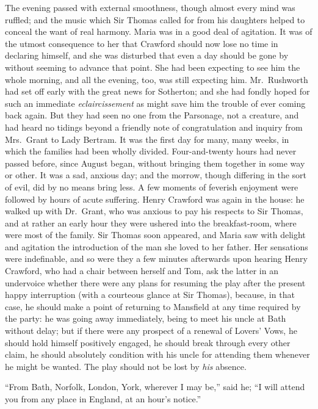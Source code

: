 \documentclass{article}
\begin{document}
The evening passed with external smoothness, though almost
every mind was ruffled; and the music which Sir Thomas
called for from his daughters helped to conceal the want
of real harmony.  Maria was in a good deal of agitation.
It was of the utmost consequence to her that Crawford
should now lose no time in declaring himself, and she
was disturbed that even a day should be gone by without
seeming to advance that point.  She had been expecting
to see him the whole morning, and all the evening, too,
was still expecting him.  Mr.\ Rushworth had set off early
with the great news for Sotherton; and she had fondly hoped
for such an immediate \emph{eclaircissement} as might save him
the trouble of ever coming back again.  But they had seen
no one from the Parsonage, not a creature, and had heard
no tidings beyond a friendly note of congratulation
and inquiry from Mrs.\ Grant to Lady Bertram.  It was
the first day for many, many weeks, in which the families
had been wholly divided.  Four-and-twenty hours had never
passed before, since August began, without bringing them
together in some way or other.  It was a sad, anxious day;
and the morrow, though differing in the sort of evil,
did by no means bring less.  A few moments of feverish
enjoyment were followed by hours of acute suffering.
Henry Crawford was again in the house:  he walked up
with Dr.\ Grant, who was anxious to pay his respects to
Sir Thomas, and at rather an early hour they were ushered
into the breakfast-room, where were most of the family.
Sir Thomas soon appeared, and Maria saw with delight
and agitation the introduction of the man she loved to
her father.  Her sensations were indefinable, and so were
they a few minutes afterwards upon hearing Henry Crawford,
who had a chair between herself and Tom, ask the latter
in an undervoice whether there were any plans for resuming
the play after the present happy interruption (with
a courteous glance at Sir Thomas), because, in that case,
he should make a point of returning to Mansfield at any time
required by the party:  he was going away immediately,
being to meet his uncle at Bath without delay; but if there
were any prospect of a renewal of Lovers' Vows, he should
hold himself positively engaged, he should break through
every other claim, he should absolutely condition with his
uncle for attending them whenever he might be wanted.
The play should not be lost by \emph{his} absence.

``From Bath, Norfolk, London, York, wherever I may be,''
said he; ``I will attend you from any place in England,
at an hour's notice.''
\end{document}
